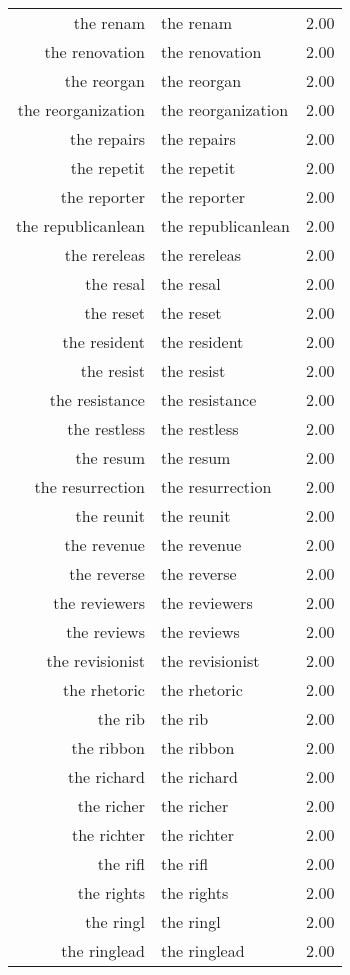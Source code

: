 \begin{table}[ht]
\begin{tabular}{rlr}
  the renam & the renam & 2.00 \\ 
  the renovation & the renovation & 2.00 \\ 
  the reorgan & the reorgan & 2.00 \\ 
  the reorganization & the reorganization & 2.00 \\ 
  the repairs & the repairs & 2.00 \\ 
  the repetit & the repetit & 2.00 \\ 
  the reporter & the reporter & 2.00 \\ 
  the republicanlean & the republicanlean & 2.00 \\ 
  the rereleas & the rereleas & 2.00 \\ 
  the resal & the resal & 2.00 \\ 
  the reset & the reset & 2.00 \\ 
  the resident & the resident & 2.00 \\ 
  the resist & the resist & 2.00 \\ 
  the resistance & the resistance & 2.00 \\ 
  the restless & the restless & 2.00 \\ 
  the resum & the resum & 2.00 \\ 
  the resurrection & the resurrection & 2.00 \\ 
  the reunit & the reunit & 2.00 \\ 
  the revenue & the revenue & 2.00 \\ 
  the reverse & the reverse & 2.00 \\ 
  the reviewers & the reviewers & 2.00 \\ 
  the reviews & the reviews & 2.00 \\ 
  the revisionist & the revisionist & 2.00 \\ 
  the rhetoric & the rhetoric & 2.00 \\ 
  the rib & the rib & 2.00 \\ 
  the ribbon & the ribbon & 2.00 \\ 
  the richard & the richard & 2.00 \\ 
  the richer & the richer & 2.00 \\ 
  the richter & the richter & 2.00 \\ 
  the rifl & the rifl & 2.00 \\ 
  the rights & the rights & 2.00 \\ 
  the ringl & the ringl & 2.00 \\ 
  the ringlead & the ringlead & 2.00 \\ 

\end{tabular}
\end{table}
